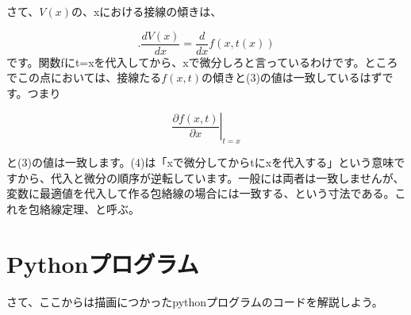 \documentclass[11pt,a4j,fleqn]{jarticle}
\begin{document}
さて、$V(x)$の、xにおける接線の傾きは、

\begin{equation}
.\frac{dV(x)}{dx} = \frac{d}{dx}f(x,t(x))  
\end{equation}
です。関数fにt=xを代入してから、xで微分しろと言っているわけです。ところでこの点においては、接線たる$f(x,t)$の傾きと(3)の値は一致しているはずです。つまり

\begin{equation}
\left.\frac{\partial f(x,t)}{\partial x}\right|_{t = x} 
\end{equation}

と(3)の値は一致します。(4)は「xで微分してからtにxを代入する」という意味ですから、代入と微分の順序が逆転しています。一般には両者は一致しませんが、変数に最適値を代入して作る包絡線の場合には一致する、という寸法である。これを包絡線定理、と呼ぶ。

\section{Pythonプログラム}

さて、ここからは描画につかったpythonプログラムのコードを解説しよう。
\end{document}
